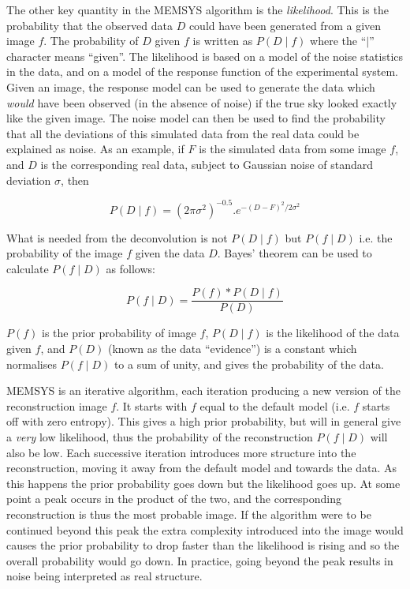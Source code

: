 The other key quantity in the MEMSYS algorithm is the {\em likelihood}. This is 
the probability that the observed data $D$ could have been generated from a 
given image $f$. The probability of $D$ given $f$  is written as $P( D \mid f )$
where the ``$\mid$'' character means ``given''. The likelihood is based on a 
model of the noise statistics in the data, and on a model of the response 
function of the experimental system. Given an image, the response model can be 
used to generate the data which {\em would} have been observed (in the absence 
of noise) if the true sky looked exactly like the given image. The noise model 
can then be used to find the probability that all the deviations of 
this simulated data from the real data could be explained as noise. As an 
example, if $F$ is the simulated data from some image $f$, and $D$ is the 
corresponding real data, subject to Gaussian noise of standard deviation 
$\sigma$, then 

\begin{equation}
P(D \mid f) = (2\pi\sigma^{2})^{-0.5}.e^{-(D-F)^{2}/2\sigma^{2}}
\end{equation}

What is needed from the deconvolution is not $P( D \mid f)$ but $P( f \mid D)$
i.e. the probability of the image $f$ given the data $D$. Bayes' theorem can be 
used to calculate $P( f \mid D )$ as follows:

\begin{equation}
P(f \mid D) =\frac{P(f)*P(D \mid f)}{P(D)} \label{EQ:BAYES}
\end{equation}

$P(f)$ is the prior probability of image $f$, $P( D \mid f )$ is the likelihood
of  the data given $f$, and $P(D)$ (known as the data ``evidence'') is a
constant  which normalises $P( f \mid D )$ to a sum of unity, and gives the
probability of  the data.

MEMSYS is an iterative algorithm, each iteration producing a new version of 
the reconstruction image $f$. It starts with $f$ equal to the default model
(i.e. $f$ starts off with zero entropy).  This gives a high prior probability,
but will in general give a {\em very} low likelihood, thus the probability of
the reconstruction $P(f \mid D)$ will  also be low. Each successive iteration
introduces more structure into the  reconstruction, moving it away from the
default model and towards the data. As  this happens the prior probability goes
down but the likelihood goes up. At some  point a peak occurs in the product of
the two, and the corresponding  reconstruction is thus the most probable image.
If the algorithm were to be  continued beyond this peak the extra complexity
introduced into the image would causes the  prior probability to drop faster
than the likelihood is rising and so the overall  probability would go down. In
practice, going beyond the peak results in noise  being interpreted as real
structure.

